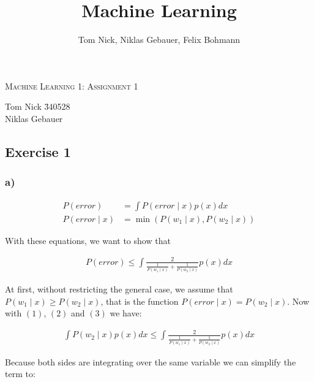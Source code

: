 \documentclass[10pt,a4paper]{article}
\author{Tom Nick, Niklas Gebauer, Felix Bohmann}
\title{Machine Learning}
\begin{document}
\begin{center}
\Large{\textsc{Machine Learning 1: Assignment 1}} \\
\end{center}

\begin{tabbing}
Tom Nick \hspace{0.9cm}\= 340528\\
Niklas Gebauer 
\end{tabbing}

\subsection*{Exercise 1}
\subsubsection*{a)}
\begin{align}
	P(error) &= \int P(error\mid x)p(x) dx \label{eq1} \\
	P(error\mid x) &= \min (P(w_1\mid x), P(w_2\mid x)) \label{eq2}
\end{align}

With these equations, we want to show that

\begin{align}
	P(error) \le \int \frac{2}{\frac{1}{P(w_1\mid x)} + \frac{1}{P(w_2 \mid x)}} p(x) dx \label{eq3}
\end{align}

At first, without restricting the general case, we assume that $P(w_1 \mid x) \ge P(w_2 \mid x) \label{ass1}$, that is the function $P(error \mid x) = P(w_2 \mid x)$. Now with $(1)$, $(2)$ and $(3)$ we have:

\begin{align*}
	\int P(w_2 \mid x)p(x) dx \le \int \frac{2}{\frac{1}{P(w_1\mid x)} + \frac{1}{P(w_2 \mid x)}} p(x) dx
\end{align*}

Because both sides are integrating over the same variable we can simplify the term to:
\end{document}
